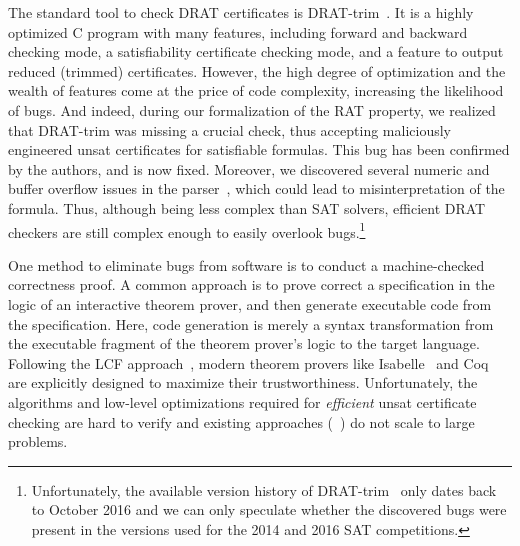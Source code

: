 \documentclass{llncs}
\begin{document}
The standard tool to check DRAT certificates is DRAT-trim~\cite{WHH14,drat-trim-webpage}. 
It is a highly optimized C program with many features, including forward and backward checking mode, a satisfiability certificate checking mode,
and a feature to output reduced (trimmed) certificates.
% 
% 
However, the high degree of optimization and the wealth of features come at the price of code complexity, increasing the likelihood of bugs. And indeed, 
during our formalization of the RAT property, we realized that DRAT-trim was missing a crucial check, thus accepting maliciously engineered unsat certificates 
for satisfiable formulas. This bug has been confirmed by the authors, and is now fixed.
Moreover, we discovered several numeric and buffer overflow issues in the parser~\cite{drat-trim-issues}, which could lead to misinterpretation of the formula.
Thus, although being less complex than SAT solvers, efficient DRAT checkers are still complex enough to easily overlook bugs.\footnote{Unfortunately, the available version history of DRAT-trim~\cite{drat-trim-github} only dates back to October 2016 and we can only speculate whether the discovered bugs were present in the versions used for the 2014 and 2016 SAT competitions.} 

One method to eliminate bugs from software is to conduct a machine-checked correctness proof. 
A common approach is to prove correct a specification in the logic of an interactive theorem prover, and then generate executable code from 
the specification. Here, code generation is merely a syntax transformation from the executable fragment of the theorem prover's logic to the target language.
Following the LCF approach~\cite{Gord00}, modern theorem provers like Isabelle~\cite{NPW02} and Coq~\cite{BeCa10} are explicitly designed to maximize their trustworthiness.
Unfortunately, the algorithms and low-level optimizations required for \emph{efficient} unsat certificate checking are 
hard to verify and existing approaches (\eg~\cite{DFM10,WHH13}) do not scale to large problems.
\end{document}
